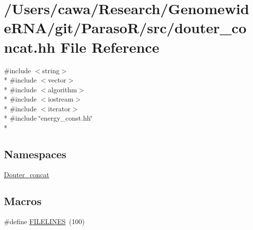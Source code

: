 \hypertarget{douter__concat_8hh}{\section{/\+Users/cawa/\+Research/\+Genomewide\+R\+N\+A/git/\+Paraso\+R/src/douter\+\_\+concat.hh File Reference}
\label{douter__concat_8hh}
}
{\ttfamily \#include $<$string$>$}\\*
{\ttfamily \#include $<$vector$>$}\\*
{\ttfamily \#include $<$algorithm$>$}\\*
{\ttfamily \#include $<$iostream$>$}\\*
{\ttfamily \#include $<$iterator$>$}\\*
{\ttfamily \#include \char`\"{}energy\+\_\+const.\+hh\char`\"{}}\\*
\subsection*{Namespaces}
\begin{DoxyCompactItemize}
\item 
 \hyperlink{namespace_douter__concat}{Douter\+\_\+concat}
\end{DoxyCompactItemize}
\subsection*{Macros}
\begin{DoxyCompactItemize}
\item 
\#define \hyperlink{douter__concat_8hh_ad3b770b661fc5cdd44d05e924cd76a12}{F\+I\+L\+E\+L\+I\+N\+E\+S}~(100)
\end{DoxyCompactItemize}
